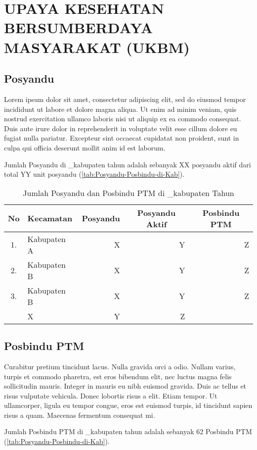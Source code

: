 \section[UKBM]{UPAYA KESEHATAN BERSUMBERDAYA MASYARAKAT (UKBM)}%
\subsection{Posyandu}
Lorem ipsum dolor sit amet, consectetur adipiscing elit, sed do eiusmod tempor incididunt ut labore et dolore magna aliqua. Ut enim ad minim veniam, quis nostrud exercitation ullamco laboris nisi ut aliquip ex ea commodo consequat. Duis aute irure dolor in reprehenderit in voluptate velit esse cillum dolore eu fugiat nulla pariatur. Excepteur sint occaecat cupidatat non proident, sunt in culpa qui officia deserunt mollit anim id est laborum.

Jumlah Posyandu di \nama_kabupaten tahun \tP adalah sebanyak XX posyandu aktif dari total YY unit posyandu (\autoref{tab:Posyandu-Posbindu-di-Kab}).

\begin{table}[!h]
\caption{Jumlah Posyandu dan Posbindu PTM di \nama_kabupaten Tahun \tP }
\label{tab:Posyandu-Posbindu-di-Kab}
\centering{}%

\begin{tabular}{clrrr}
\toprule
No & Kecamatan & \multicolumn{1}{c}{Posyandu} & \multicolumn{1}{c}{Posyandu Aktif} & \multicolumn{1}{c}{Posbindu PTM}\\
\midrule
1. & Kabupaten A & X & Y & Z\\
\rowcolor{black!20}2. & Kabupaten B & X & Y & Z\\
3. & Kabupaten B & X & Y & Z\\
\midrule
\rowcolor{blue!20}\multicolumn{2}{c}{Jumlah} & X & Y & Z\\
\bottomrule
\end{tabular}
\end{table}

\subsection{Posbindu PTM}
Curabitur pretium tincidunt lacus. Nulla gravida orci a odio. Nullam varius, turpis et commodo pharetra, est eros bibendum elit, nec luctus magna felis sollicitudin mauris. Integer in mauris eu nibh euismod gravida. Duis ac tellus et risus vulputate vehicula. Donec lobortis risus a elit. Etiam tempor. Ut ullamcorper, ligula eu tempor congue, eros est euismod turpis, id tincidunt sapien risus a quam. Maecenas fermentum consequat mi. 

Jumlah Posbindu PTM di \nama_kabupaten tahun \tP adalah sebanyak 62 Posbindu PTM (\autoref{tab:Posyandu-Posbindu-di-Kab}).
